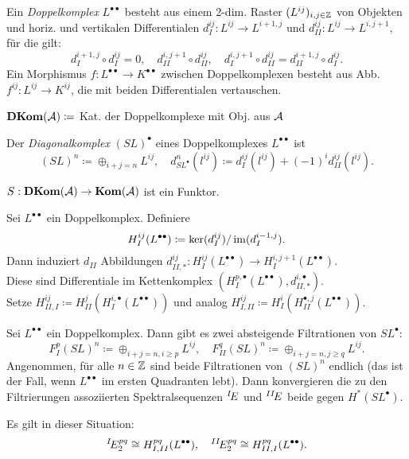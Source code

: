 \documentclass{cheat-sheet}
\newcommand{\CCC}[1]{{#1}^{\bullet}} %
\newcommand{\DC}[1]{{#1}^{\bullet \bullet}} %
\newcommand{\DKom}{\mathbf{DKom}} %
\begin{document}
\begin{defn}
  Ein \emph{Doppelkomplex} $\DC{L}$ besteht aus einem 2-dim. Raster $(L^{ij})_{i, j \in \mathbb{Z}}$ von Objekten und horiz. und vertikalen Differentialen $d^{ij}_I : L^{ij} \to L^{i+1,j}$ und $d^{ij}_{II} : L^{ij} \to L^{i,j+1}$, für die gilt:
  \[
    d^{i+1,j}_I \circ d^{ij}_I = 0, \quad
    d^{i,j+1}_{II} \circ d^{ij}_{II}, \quad
    d^{i,j+1}_I \circ d^{ij}_{II} = d^{i+1,j}_{II} \circ d^{ij}_I.
  \]
  Ein Morphismus $f : \DC{L} \to \DC{K}$ zwischen Doppelkomplexen besteht aus Abb. $f^{ij} : L^{ij} \to K^{ij}$, die mit beiden Differentialen vertauschen.
\end{defn}

\begin{nota}
  $\DKom(\Aat) \coloneqq $ Kat. der Doppelkomplexe mit Obj. aus $\mathcal{A}$
\end{nota}

\begin{defn}
  Der \emph{Diagonalkomplex} $\CCC{(SL)}$ eines Doppelkomplexes $\DC{L}$ ist
  \[
    (SL)^n \coloneqq \oplus_{i+j=n} L^{ij}, \quad
    d^n_{\CCC{SL}}(l^{ij}) \coloneqq d^{ij}_I(l^{ij}) + (-1)^i d^{ij}_{II}(l^{ij}).
  \]
\end{defn}

\begin{bem}
  $S : \DKom(\Aat) \to \Kom(\Aat)$ ist ein Funktor.
\end{bem}


\begin{defn}
  Sei $\DC{L}$ ein Doppelkomplex. Definiere
  \[
    H^{ij}_I(\DC{L}) \coloneqq \ker(d^{ij}_I) / \im(d^{i-1,j}_I).
  \]
  Dann induziert $d_{II}$ Abbildungen $d^{ij}_{II,*} : H^{ij}_I(\DC{L}) \to H^{i,j+1}_I(\DC{L})$. \\
  Diese sind Differentiale im Kettenkomplex $(H_I^{p,\bullet}(\DC{L}), d^{i, \bullet}_{II,*})$. \\
  Setze $H^{ij}_{II,I} \coloneqq H_{II}^{j}(H_I^{i,\bullet}(\DC{L}))$
  und analog $H^{ij}_{I,II} \coloneqq H_{I}^{i}(H_{II}^{\bullet,j}(\DC{L}))$.
\end{defn}

\begin{bem}
  Sei $\DC{L}$ ein Doppelkomplex. Dann gibt es zwei absteigende Filtrationen von $\CCC{SL}$:
  \[
    F^p_I(SL)^n \coloneqq \oplus_{i+j=n,i \geq p} L^{ij}, \quad
    F^q_{II}(SL)^n \coloneqq \oplus_{i+j=n,j \geq q} L^{ij}.
  \]
  Angenommen, für alle $n \in \mathbb{Z}$ sind beide Filtrationen von $(SL)^n$ endlich (das ist \zB{} der Fall, wenn $\DC{L}$ im ersten Quadranten lebt).
  Dann konvergieren die zu den Filtrierungen assoziierten Spektralsequenzen $\prescript{I}{}\!E$ und $\prescript{II}{}\!E$ beide gegen $H^*(\CCC{SL})$.
\end{bem}

\begin{prop}
  Es gilt in dieser Situation:
  \[
    \prescript{I}{}\!E^{pq}_2 \cong H^{pq}_{I,II}(\DC{L}), \quad
    \prescript{II}{}\!E^{pq}_2 \cong H^{pq}_{II,I}(\DC{L}).
  \]
\end{prop}

\end{document}
